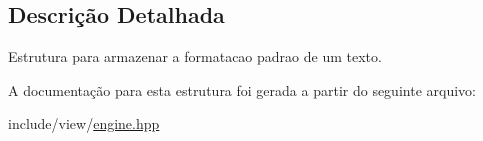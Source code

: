 \subsection{Descrição Detalhada}
Estrutura para armazenar a formatacao padrao de um texto. 

A documentação para esta estrutura foi gerada a partir do seguinte arquivo:\begin{DoxyCompactItemize}
\item 
include/view/\hyperlink{engine_8hpp}{engine.hpp}\end{DoxyCompactItemize}

